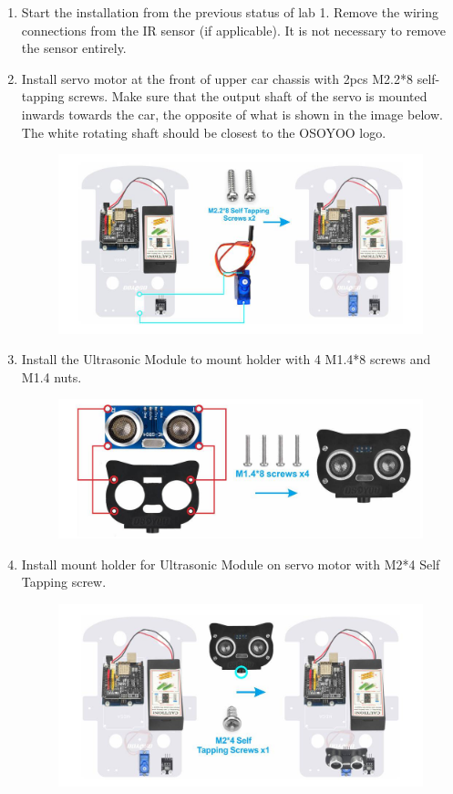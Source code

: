 \documentclass{article}
\begin{document}
\begin{enumerate}
	\item Start the installation from the previous status of lab 1. Remove the wiring connections from the IR sensor (if applicable). It is not necessary to remove the sensor entirely. 
	
	\item Install servo motor at the front of upper car chassis with 2pcs M2.2*8 self-tapping screws. Make sure that the output shaft of the servo is mounted inwards towards the car, the opposite of what is shown in the image below. The white rotating shaft should be closest to the OSOYOO logo.
	
	\begin{figure}[H]
		\centering
		\includegraphics[width=0.7\linewidth]{Images/image2}
		\label{fig:image2}
	\end{figure}

	\item Install the Ultrasonic Module to mount holder with 4 M1.4*8 screws and M1.4 nuts. 
	
	\begin{figure}[H]
		\centering
		\includegraphics[width=0.7\linewidth]{Images/image3}
		\label{fig:image3}
	\end{figure}
	
	\item Install mount holder for Ultrasonic Module on servo motor with M2*4 Self Tapping screw.
	
	\begin{figure}[H]
		\centering
		\includegraphics[width=0.7\linewidth]{Images/image4}
		\label{fig:image4}
	\end{figure}
	

\end{enumerate}
\end{document}
